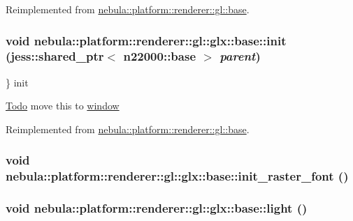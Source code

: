 Reimplemented from \hyperlink{classnebula_1_1platform_1_1renderer_1_1gl_1_1base_ae07ce667896249b4b60e800a985f0721}{nebula::platform::renderer::gl::base}.\hypertarget{classnebula_1_1platform_1_1renderer_1_1gl_1_1glx_1_1base_a08357ff32222b7e316db783de5755a2e}{
\subsubsection[{init}]{\setlength{\rightskip}{0pt plus 5cm}void nebula::platform::renderer::gl::glx::base::init (jess::shared\_\-ptr$<$ {\bf n22000::base} $>$ {\em parent})}}
\label{classnebula_1_1platform_1_1renderer_1_1gl_1_1glx_1_1base_a08357ff32222b7e316db783de5755a2e}
\} init 

\begin{Desc}
\item[\hyperlink{todo__todo000009}{Todo}]move this to \hyperlink{namespacenebula_1_1platform_1_1window}{window} \end{Desc}


Reimplemented from \hyperlink{classnebula_1_1platform_1_1renderer_1_1gl_1_1base_affa88173c0ac23d9245a9addd721488b}{nebula::platform::renderer::gl::base}.\hypertarget{classnebula_1_1platform_1_1renderer_1_1gl_1_1glx_1_1base_a36d7ae28f7c0c727e45ee36a48160928}{
\subsubsection[{init\_\-raster\_\-font}]{\setlength{\rightskip}{0pt plus 5cm}void nebula::platform::renderer::gl::glx::base::init\_\-raster\_\-font ()}}
\label{classnebula_1_1platform_1_1renderer_1_1gl_1_1glx_1_1base_a36d7ae28f7c0c727e45ee36a48160928}
\hypertarget{classnebula_1_1platform_1_1renderer_1_1gl_1_1glx_1_1base_a111905577043b961ebf0f7111e8ec998}{
\subsubsection[{light}]{\setlength{\rightskip}{0pt plus 5cm}void nebula::platform::renderer::gl::glx::base::light ()}}
\label{classnebula_1_1platform_1_1renderer_1_1gl_1_1glx_1_1base_a111905577043b961ebf0f7111e8ec998}


